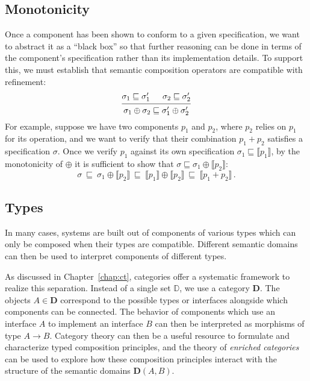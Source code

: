 \documentclass[11pt,oneside,draft]{book}
\theoremstyle{definition}
\newcommand{\refby}{\sqsubseteq} %
\begin{document}

\subsection{Monotonicity} %

Once a component has been shown to conform to a given specification,
we want to abstract it as a ``black box''
so that further reasoning can be done in terms of
the component's specification rather than its implementation details.
To support this,
we must establish that semantic composition operators
are compatible with refinement:
\[
  \begin{prooftree}
    \hypo{\sigma_1 \refby \sigma_1'}
    \hypo{\sigma_2 \refby \sigma_2'}
    \infer2{\sigma_1 \oplus \sigma_2 \refby \sigma_1' \oplus \sigma_2'}
  \end{prooftree}
\]
For example,
suppose we have two components $p_1$ and $p_2$,
where $p_2$ relies on $p_1$ for its operation,
and we want to verify that their combination $p_1 + p_2$
satisfies a specification $\sigma$.
Once we verify $p_1$ against its own specification
$\sigma_1 \refby \llbracket p_1 \rrbracket$,
by the monotonicity of ${\oplus}$ it is sufficient to show that
$\sigma \refby \sigma_1 \oplus \llbracket p_2 \rrbracket$:
\[
   \sigma \:\refby\:
   \sigma_1 \oplus \llbracket p_2 \rrbracket \:\refby\:
   \llbracket p_1 \rrbracket \oplus \llbracket p_2 \rrbracket \:\refby\:
   \llbracket p_1 + p_2 \rrbracket \,.
\]


\subsection{Types} %

In many cases,
systems are built out of components of various types
which can only be composed when their types are compatible.
Different semantic domains can then be used
to interpret components of different types.

As discussed in Chapter~\ref{chap:ct},
categories offer a systematic framework
to realize this separation.
Instead of a single set $\mathbb{D}$,
we use a category $\mathbf{D}$.
The objects $A \in \mathbf{D}$ correspond to
the possible types or interfaces alongside which
components can be connected.
The behavior of components which
use an interface $A$ to
implement an interface $B$
can then be interpreted as morphisms
of type $A \rightarrow B$.
Category theory can then be a useful resource
to formulate and characterize typed composition principles,
and the theory of \emph{enriched categories}
can be used to explore how these composition principles
interact with the structure of the semantic domains
$\mathbf{D}(A, B)$.
\end{document}
